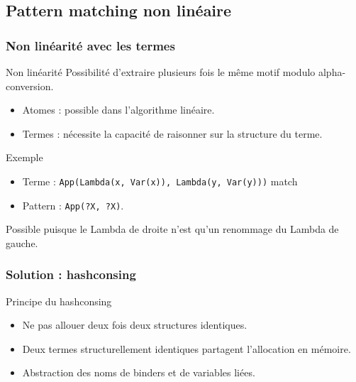 \subsection{Pattern matching non linéaire}

\begin{frame}
\frametitle{Non linéarité avec les termes}

\begin{block}{Non linéarité}
Possibilité d'extraire plusieurs fois le même motif modulo alpha-conversion.
\begin{itemize}
\item Atomes : possible dans l'algorithme linéaire.
\item Termes : nécessite la capacité de raisonner sur la structure du terme.
\end{itemize}
\end{block}

\pause

\begin{block}{Exemple}
\begin{itemize}
\item Terme : \texttt{App(Lambda(x, Var(x)), Lambda(y, Var(y)))} match
\item Pattern : \texttt{App(?X, ?X)}.
\end{itemize}
\end{block}

\medskip

Possible puisque le Lambda de droite n'est qu'un renommage du Lambda de gauche.

\end{frame}

\begin{frame}
\frametitle{Solution : hashconsing}

\begin{block}{Principe du hashconsing}
\begin{itemize}
\item Ne pas allouer deux fois deux structures identiques.
\item Deux termes structurellement identiques partagent l'allocation en mémoire.
\item Abstraction des noms de binders et de variables
liées.
\end{itemize}
\end{block}

\end{frame}

